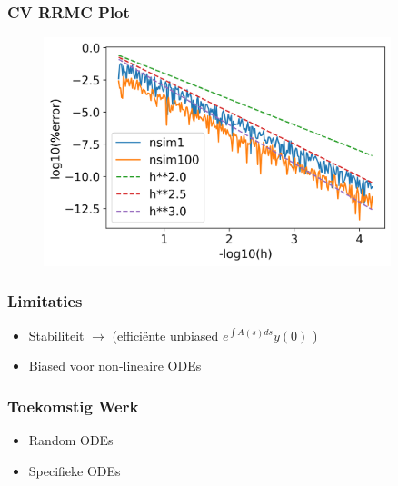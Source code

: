\documentclass[20pt]{beamer}
\begin{document}
\begin{frame}
    \frametitle{CV RRMC Plot}
    \begin{figure}[h]
        \centering
        \includegraphics[width=0.9\textwidth]{imgs/CV RRMC IVP.png}
    \end{figure}
\end{frame}

\begin{frame}
    \frametitle{Limitaties}
    \begin{itemize}
        \item Stabiliteit $\rightarrow$ \cite{kettunen_unbiased_2021}
              (efficiënte unbiased $e^{\int A(s) ds } y(0)$ )
        \item Biased voor non-lineaire ODEs
    \end{itemize}
\end{frame}

\begin{frame}
    \frametitle{Toekomstig Werk}
    \begin{itemize}
        \item Random ODEs
        \item Specifieke ODEs
    \end{itemize}
\end{frame}

\end{document}

